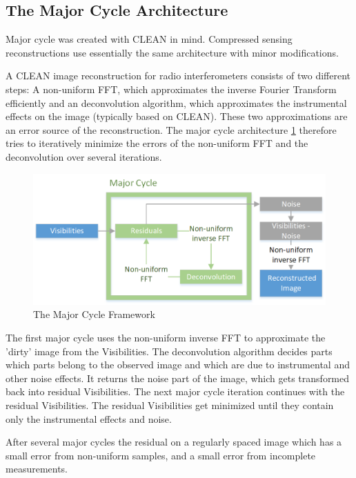 \subsection{The Major Cycle Architecture}
Major cycle was created with CLEAN in mind. Compressed sensing reconstructions use essentially the same architecture with minor modifications. 

A CLEAN image reconstruction for radio interferometers consists of two different steps: A non-uniform FFT, which approximates the inverse Fourier Transform efficiently and an deconvolution algorithm, which approximates the instrumental effects on the image (typically based on CLEAN). These two approximations are an error source of the reconstruction. The major cycle architecture \ref{intro:major} therefore tries to iteratively minimize the errors of the non-uniform FFT and the deconvolution over several iterations.

\begin{figure}
	\centering
	\vspace{-10pt}
	\includegraphics[width=1.0\linewidth]{./chapters/01.intro/Major-Minor.png}
	\caption{The Major Cycle Framework}
	\label{intro:major}
	\vspace{-10pt}
\end{figure}

The first major cycle uses the non-uniform inverse FFT to approximate the 'dirty' image from the Visibilities. The deconvolution algorithm decides parts which parts belong to the observed image and which are due to instrumental and other noise effects. It returns the noise part of the image, which gets transformed back into residual Visibilities. The next major cycle iteration continues with the residual Visibilities. The residual Visibilities get minimized until they contain only the instrumental effects and noise.

After several major cycles the residual  on a regularly spaced image which has a small error from non-uniform samples, and a small error from incomplete measurements.


